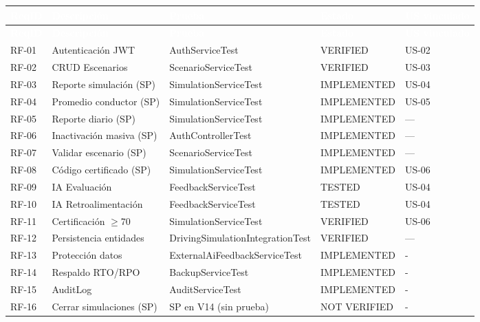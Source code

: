 \documentclass[11pt,a4paper]{article}
\begin{document}
\begin{longtable}{|p{1.6cm}|p{4.5cm}|p{3cm}|p{1.5cm}|p{2cm}|}
    \hline
    \rowcolor{uteqblue}
    \textcolor{white}{\textbf{ReqID}} & \textcolor{white}{\textbf{Descripción}} & \textcolor{white}{\textbf{Prueba}} & \textcolor{white}{\textbf{Estado}} & \textcolor{white}{\textbf{US vinculado}} \\ \hline
    \endfirsthead
    \hline
    \rowcolor{uteqblue}
    \textcolor{white}{\textbf{ReqID}} & \textcolor{white}{\textbf{Descripción}} & \textcolor{white}{\textbf{Prueba}} & \textcolor{white}{\textbf{Estado}} & \textcolor{white}{\textbf{US vinculado}} \\ \hline
    \endhead
    RF-01 & Autenticación JWT & AuthServiceTest & VERIFIED & US-02 \\ \hline
    RF-02 & CRUD Escenarios & ScenarioServiceTest & VERIFIED & US-03 \\ \hline
    RF-03 & Reporte simulación (SP) & SimulationServiceTest & IMPLEMENTED & US-04 \\ \hline
    RF-04 & Promedio conductor (SP) & SimulationServiceTest & IMPLEMENTED & US-05 \\ \hline
    RF-05 & Reporte diario (SP) & SimulationServiceTest & IMPLEMENTED & — \\ \hline
    RF-06 & Inactivación masiva (SP) & AuthControllerTest & IMPLEMENTED & — \\ \hline
    RF-07 & Validar escenario (SP) & ScenarioServiceTest & IMPLEMENTED & — \\ \hline
    RF-08 & Código certificado (SP) & SimulationServiceTest & IMPLEMENTED & US-06 \\ \hline
    RF-09 & IA Evaluación & FeedbackServiceTest & TESTED & US-04 \\ \hline
    RF-10 & IA Retroalimentación & FeedbackServiceTest & TESTED & US-04 \\ \hline
    RF-11 & Certificación $\geq$70 & SimulationServiceTest & VERIFIED & US-06 \\ \hline
    RF-12 & Persistencia entidades & DrivingSimulationIntegrationTest & VERIFIED & — \\ \hline
    RF-13 & Protección datos & ExternalAiFeedbackServiceTest & IMPLEMENTED & - \\ \hline
    RF-14 & Respaldo RTO/RPO & BackupServiceTest & IMPLEMENTED & - \\ \hline
    RF-15 & AuditLog & AuditServiceTest & IMPLEMENTED & - \\ \hline
    RF-16 & Cerrar simulaciones (SP) & SP en V14 (sin prueba) & NOT VERIFIED & - \\ \hline

\end{longtable}
\end{document}

